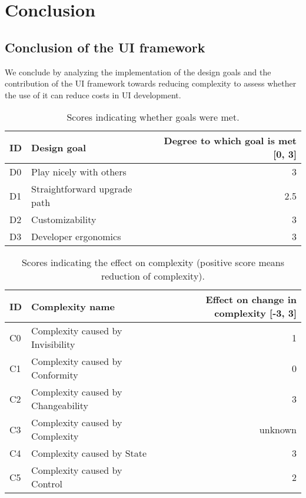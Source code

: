 \section{Conclusion}\label{conclusion}

\subsection{Conclusion of the UI framework}
We conclude by analyzing the implementation of the design goals and the contribution of the UI framework towards reducing complexity to assess whether the use of it can reduce costs in UI development.

\begin{table}[]
  \begin{center}
    \begin{tabular}{|l|l|r|}
      \hline
      ID & Design goal & Degree to which goal is met [0, 3] \\
      \hline
      D0 & Play nicely with others & 3 \\
      D1 & Straightforward upgrade path & 2.5 \\
      D2 & Customizability & 3 \\
      D3 & Developer ergonomics & 3 \\
      \hline
    \end{tabular}
    \caption{Scores indicating whether goals were met.}
  \end{center}
\end{table}

\begin{table}[]
  \begin{center}
    \begin{tabular}{|l|l|r|}
      \hline
      ID & Complexity name & Effect on change in complexity [-3, 3] \\
      \hline
      C0 & Complexity caused by Invisibility & 1 \\
      C1 & Complexity caused by Conformity & 0 \\
      C2 & Complexity caused by Changeability & 3 \\
      C3 & Complexity caused by Complexity & unknown \\
      C4 & Complexity caused by State & 3 \\
      C5 & Complexity caused by Control & 2 \\
      \hline
    \end{tabular}
    \caption{Scores indicating the effect on complexity (positive score means reduction of complexity).}
    \label{tab:summarycomplexity}
  \end{center}
\end{table}

